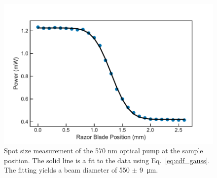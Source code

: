 \begin{figure}[h]
	\centering
	\includegraphics[scale=0.65]{images/chapter_methods/pump_spot_size}
	\caption{Spot size measurement of the 570 nm optical pump at the sample position. The solid line is a fit to the data using Eq.\ \ref{eq:cdf_gauss}. The fitting yields a beam diameter of 550 $\pm$ \SI{9}{\micro\meter}.}
\end{figure}



